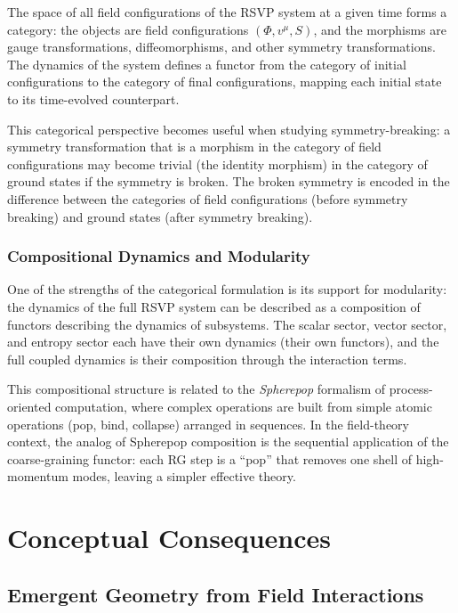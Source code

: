 \documentclass[12pt,a4paper,oneside]{book}
\theoremstyle{definition}
\theoremstyle{plain}
\theoremstyle{remark}
\begin{document}
The space of all field configurations of the RSVP system at a given time
forms a category: the objects are field configurations $(\Phi, v^\mu, S)$,
and the morphisms are gauge transformations, diffeomorphisms, and other
symmetry transformations. The dynamics of the system defines a functor from
the category of initial configurations to the category of final configurations,
mapping each initial state to its time-evolved counterpart.

This categorical perspective becomes useful when studying symmetry-breaking:
a symmetry transformation that is a morphism in the category of field
configurations may become trivial (the identity morphism) in the category
of ground states if the symmetry is broken. The broken symmetry is encoded
in the difference between the categories of field configurations (before
symmetry breaking) and ground states (after symmetry breaking).

\section{Compositional Dynamics and Modularity}

One of the strengths of the categorical formulation is its support for
modularity: the dynamics of the full RSVP system can be described as a
composition of functors describing the dynamics of subsystems. The scalar
sector, vector sector, and entropy sector each have their own dynamics
(their own functors), and the full coupled dynamics is their composition
through the interaction terms.

This compositional structure is related to the \emph{Spherepop} formalism
of process-oriented computation, where complex operations are built from
simple atomic operations (pop, bind, collapse) arranged in sequences.
In the field-theory context, the analog of Spherepop composition is the
sequential application of the coarse-graining functor: each RG step is a
``pop'' that removes one shell of high-momentum modes, leaving a simpler
effective theory.

\part{Conceptual Consequences}

\chapter{Emergent Geometry from Field Interactions}
\end{document}
